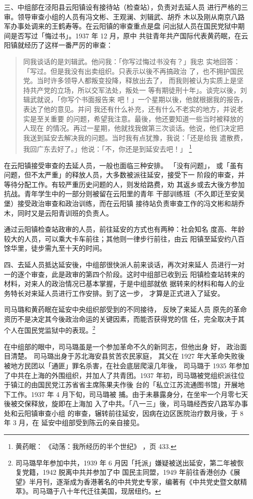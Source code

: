三、中组部在泾阳县云阳镇设有接待站（检查站），负责对去延人员
进行严格的三审。领导审查小组的人员有冯文彬、王观澜、刘辑武、胡乔
木以及刚从南京八路军办事处调来的王鹤寿等。在云阳镇的审查重点是盘
问出狱人员在国民党狱中期间是否写过「悔过书」。1937 年 12 月，原中
共驻青年共产国际代表黄药眠，在云阳镇就经历了这样一番严厉的审查：
\begin{quote}
{\fzwkai 同我谈话的是刘辑武。他问我：「你写过悔过书没有？」我忠
实地回答：「写过。但是我没有出卖组织。只表示以後不再搞政治
了，也不拥护国民党。当时许多领导人都叛变投降，释放出去了，
而我则被认为实质上是坚持共产党的立场，所以交军法处，叛处一
等有期徒刑十年」。谈完以後，刘辑武就说，「你写个书面报告来
吧！」一个星期以後，他就根据我的报告，表达了他的意见。并问
我还有什么补充，还有什么不老实的地方，并说老实是至关重要
的问题，希望我注意。最後，他还要知道一些当时被释放的人现在
的情况。再过一星期，他就找我做第三次谈话。他说，他们决定把
我送到延安去解决我的问题。当时我有点犹豫，我说：「还是给我
遣散费，我回广东去好了。」他说：「不，你还是到延安去吧！」}
\footnote{黄药眠：
《动荡：我所经历的半个世纪》
，页 433. }
\end{quote}
在云阳镇接受审查的去延人员，一般也面临三种安排。
「没有问题」，
或「虽有问题，但不太严重」的释放人员，大多数被派往延安，接受下一
阶段的审查，并等待分配工作。有较严重历史问题的人，则发给路费，劝
其返乡或去大後方参加抗战。青年学生中的一部分则被留在云阳里的青年
干部训练班（不久即迁至安吴堡）接受政治审查和政治训练，而在云阳镇
接待站负责审查工作的冯文彬和胡乔木，同时又是云阳青训班的负责人。

通过云阳镇检查站政审的人员，前往延安的方式也有两种：社会知名
度高、年龄较大的人员，可以乘大卡车前往；其他则一律步行前往，由云
阳镇至延安约八百馀华里，徒步需九至十天的时间。

四、去延人员抵达延安後，中组部很快派人前来谈话，再次对来延人
员进行一对一的逐个审查，此是政审的第四个阶段。这时中组部已收到云
阳镇检查站转来的材料，对来人的政治情况已基本掌握，于是中组部就依
据转来的材料和每人的业务特长对来延人员进行工作安排。到了这一步，
才算是正式进入了延安。

司马璐和黄药眠在延安中央组织部受到的不同接待，
反映了来延人员
原先的革命资历不是决定其今後政治命运的关键因素，而能否获得党的信
任，完全取决于其个人在国民党监狱中的表现。\footnote{司马璐早年参加中共，1939 年 6 月因「托派」嫌疑被送出延安，第二年被恢复党籍，1942 脱离中共并参加了中
国民主同盟，1949 年前往香港创办《展望》半月刊，逐渐成为香港著名的中共党史专家，编著有《中共党史暨文献精
萃》。司马璐于八十年代迁往美国，现居纽约。}

在中组部的眼中，司马璐虽是一个参加革命不久的新同志，但他出身
好，
政治面目清楚。
司马璐出身于苏北海安县贫苦农民家庭，
其父在 1927
年大革命失败後被地方民团以「通匪」罪名杀害，在社会底层爬滚几年後，
司马璐于 1935 年参加了中共在上海的外围组织，并加人了共青团。1937
年初，司马璐被党组织派往位于镇江的由国民党江苏省省主席陈果夫作後
台的「私立江苏流通图书馆」开展地下工作。1937 年 4 月下旬，司马璐被
捕。由于未暴露身分，在坐牢一个月零七天後被交保释放，旋即在上海加
入了中共。「八一三」後，司马璐经西安八路军办事处和云阳镇审查小组
的审查，辗转前往延安，因病在边区医院治疗数月後，于 8 年 3 月，在
延安中组部受到陈云的亲自接见。

